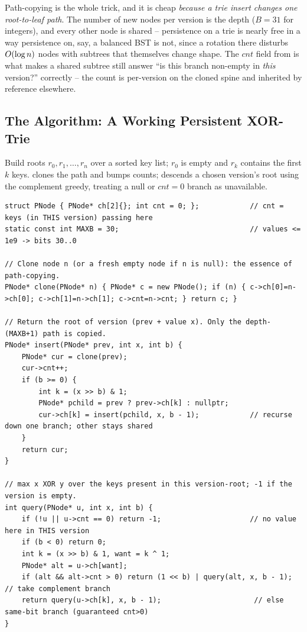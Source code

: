 \begin{insightbox}
Path-copying is the whole trick, and it is cheap \emph{because a trie insert changes one root-to-leaf
path}. The number of new nodes per version is the depth ($B=31$ for integers), and every other node is
shared -- persistence on a trie is nearly free in a way persistence on, say, a balanced BST is not, since
a rotation there disturbs $O(\log n)$ nodes with subtrees that themselves change shape. The
$\mathit{cnt}$ field from  is what makes a shared subtree still answer ``is this branch
non-empty in \emph{this} version?'' correctly -- the count is per-version on the cloned spine and inherited
by reference elsewhere.
\end{insightbox}

\subsection{The Algorithm: A Working Persistent XOR-Trie}

Build roots $r_0, r_1, \dots, r_n$ over a sorted key list; $r_0$ is empty and $r_k$ contains the first $k$
keys.  clones the path and bumps counts;  descends a chosen version's root using
the complement greedy, treating a null or $\mathit{cnt}=0$ branch as unavailable.

\begin{lstlisting}[caption={Persistent binary trie for max XOR: path-copying insert and a version-rooted complement query}, label={lst:c08-persist}]
struct PNode { PNode* ch[2]{}; int cnt = 0; };            // cnt = keys (in THIS version) passing here
static const int MAXB = 30;                               // values <= 1e9 -> bits 30..0

// Clone node n (or a fresh empty node if n is null): the essence of path-copying.
PNode* clone(PNode* n) { PNode* c = new PNode(); if (n) { c->ch[0]=n->ch[0]; c->ch[1]=n->ch[1]; c->cnt=n->cnt; } return c; }

// Return the root of version (prev + value x). Only the depth-(MAXB+1) path is copied.
PNode* insert(PNode* prev, int x, int b) {
    PNode* cur = clone(prev);
    cur->cnt++;
    if (b >= 0) {
        int k = (x >> b) & 1;
        PNode* pchild = prev ? prev->ch[k] : nullptr;
        cur->ch[k] = insert(pchild, x, b - 1);            // recurse down one branch; other stays shared
    }
    return cur;
}

// max x XOR y over the keys present in this version-root; -1 if the version is empty.
int query(PNode* u, int x, int b) {
    if (!u || u->cnt == 0) return -1;                     // no value here in THIS version
    if (b < 0) return 0;
    int k = (x >> b) & 1, want = k ^ 1;
    PNode* alt = u->ch[want];
    if (alt && alt->cnt > 0) return (1 << b) | query(alt, x, b - 1);   // take complement branch
    return query(u->ch[k], x, b - 1);                      // else same-bit branch (guaranteed cnt>0)
}
\end{lstlisting}

